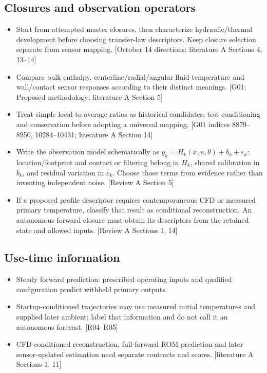 \subsection{Closures and observation operators}
\begin{itemize}[leftmargin=*]
\item Start from attempted master closures, then characterize hydraulic/thermal development before choosing transfer-law descriptors. Keep closure selection separate from sensor mapping. [October 14 directions; literature A Sections 4, 13--14]
\item Compare bulk enthalpy, centerline/radial/angular fluid temperature and wall/contact sensor responses according to their distinct meanings. [G01: Proposed methodology; literature A Section 5]
\item Treat simple local-to-average ratios as historical candidates; test conditioning and conservation before adopting a universal mapping. [G01 indices 8879--8950, 10284--10431; literature A Section 14]
\item Write the observation model schematically as $y_k=H_k(x,u,\theta)+b_k+\varepsilon_k$: location/footprint and contact or filtering belong in $H_k$, shared calibration in $b_k$, and residual variation in $\varepsilon_k$. Choose those terms from evidence rather than inventing independent noise. [Review A Section 5]\cite{jcgm2020measurementmodels}
\item If a proposed profile descriptor requires contemporaneous CFD or measured primary temperature, classify that result as conditional reconstruction. An autonomous forward closure must obtain its descriptors from the retained state and allowed inputs. [Review A Sections 1, 14]
\end{itemize}

\subsection{Use-time information}
\begin{itemize}[leftmargin=*]
\item Steady forward prediction: prescribed operating inputs and qualified configuration predict withheld primary outputs.
\item Startup-conditioned trajectories may use measured initial temperatures and supplied later ambient; label that information and do not call it an autonomous forecast. [R04--R05]
\item CFD-conditioned reconstruction, full-forward ROM prediction and later sensor-updated estimation need separate contracts and scores. [literature A Sections 1, 11]
\end{itemize}

